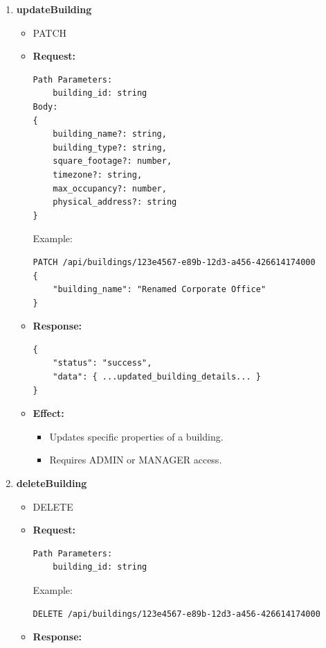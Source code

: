 \documentclass[12pt, a4paper]{article}
\begin{document}
\begin{enumerate}
\begin{itemize}
\begin{itemize}
            \item Returns energy consumption metrics for a single building over a selected time range.
        \end{itemize}
    \end{itemize}
    \item \textbf{updateBuilding}
    \begin{itemize}
        \item PATCH 
        \item \textbf{Request:}
        \begin{verbatim}
Path Parameters:
    building_id: string
Body:
{
    building_name?: string,
    building_type?: string,
    square_footage?: number,
    timezone?: string,
    max_occupancy?: number,
    physical_address?: string
}
        \end{verbatim}
        Example:
        \begin{verbatim}
PATCH /api/buildings/123e4567-e89b-12d3-a456-426614174000
{
    "building_name": "Renamed Corporate Office"
}
        \end{verbatim}
        \item \textbf{Response:}
        \begin{verbatim}
{
    "status": "success",
    "data": { ...updated_building_details... }
}
        \end{verbatim}
        \item \textbf{Effect:}
        \begin{itemize}
            \item Updates specific properties of a building.
            \item Requires ADMIN or MANAGER access.
        \end{itemize}
    \end{itemize}
    \item \textbf{deleteBuilding}
    \begin{itemize}
        \item DELETE
        \item \textbf{Request:}
        \begin{verbatim}
Path Parameters:
    building_id: string
        \end{verbatim}
        Example:
        \begin{verbatim}
DELETE /api/buildings/123e4567-e89b-12d3-a456-426614174000
        \end{verbatim}
        \item \textbf{Response:}
        \begin{verbatim}

\end{verbatim}
\end{itemize}
\end{enumerate}
\end{document}
